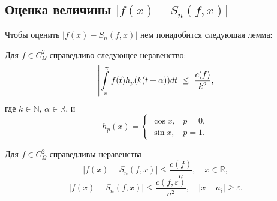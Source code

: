 \subsection{Оценка величины $\left|f(x)-S_{n}(f,x)\right|$}
Чтобы оценить $\left|f(x)-S_{n}(f,x)\right|$ нем понадобится следующая лемма:
\begin{lemma} \label{l_int_estimate}
	Для $f \in C_\Omega^2$ справедливо следующее неравенство:
	\begin{equation*}
	\left|\intop_{-\pi}^{\pi}f(t)h_{p}(k(t+\alpha))dt\right|\leq\ \frac{c(f)}{k^{2}},
	\end{equation*}
	где $k \in \mathbb{N}$, $\alpha \in \mathbb{R}$, и
	\begin{equation} \label{h_func_introduction}
	h_{p}(x)=\begin{cases}
	\cos x, & p=0,\\
	\sin x, & p=1.
	\end{cases}
	\end{equation}
\end{lemma}
\begin{lemma}
	Для $f \in C^2_\Omega$ справедливы неравенства
	\begin{equation}
	\left|f(x)-S_{n}(f,x)\right|\leq\frac{c(f)}{n},\quad x\in\mathbb{R},\label{eq:fSn_est1}
	\end{equation}
	\begin{equation}
	\left|f(x)-S_{n}(f,x)\right|\leq\frac{c(f,\varepsilon)}{n^{2}},\quad\left|x-a_{i}\right|\geq\varepsilon.\label{eq:fSn_est2}
	\end{equation}
\end{lemma}
